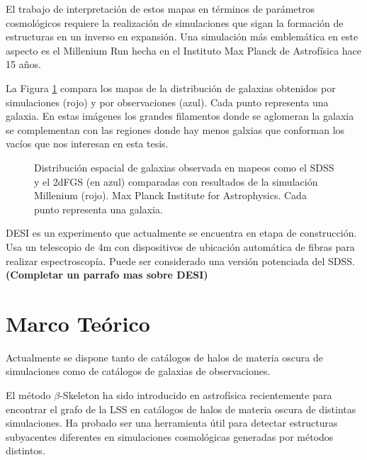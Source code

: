 \documentclass[preprint]{aastex62}
\begin{document}
El trabajo de interpretaci\'on de estos mapas en t\'erminos de
par\'ametros cosmol\'ogicos requiere la realizaci\'on de simulaciones
que sigan la formaci\'on de estructuras en un inverso en expansi\'on.
Una simulación m\'as emblem\'atica en este aspecto es el Millenium Run
hecha en el Instituto Max Planck de Astrof\'isica hace 15 a\~nos. 

La Figura \ref{fig:pie_millenium_walls} compara los mapas de la
distribuci\'on de galaxias obtenidos por simulaciones (rojo) y por
observaciones (azul).
Cada punto representa una galaxia.
En estas im\'agenes los grandes filamentos donde se aglomeran la
galaxia se complementan con las regiones donde hay menos galxias que
conforman los vac\'ios que nos interesan en esta tesis.

  \begin{figure}
    \caption{Distribuci\'on espacial de galaxias observada en mapeos
      como el SDSS y el 2dFGS (en azul) comparadas con resultados de
      la simulación Millenium (rojo). Max Planck Institute for
      Astrophysics.
      Cada punto representa una galaxia. 
      \label{fig:pie_millenium_walls}}
  \end{figure}
  
  DESI es un experimento que actualmente se encuentra en etapa de construcción. Usa un telescopio de 4m con
  dispositivos de ubicación automática de fibras para realizar espectroscopía. Puede ser considerado una versión
  potenciada del SDSS. 
{\bf (Completar un parrafo mas sobre DESI)}

  \section{Marco Teórico}

  Actualmente se dispone tanto de catálogos de halos de materia oscura de simulaciones como de catálogos de
  galaxias de observaciones.


  El método $\beta$-Skeleton ha sido introducido en astrofísica recientemente \citep{Fang2018} para
  encontrar el grafo de la LSS en catálogos de halos de materia oscura de distintas simulaciones.
  Ha probado ser una herramienta útil para detectar estructuras subyacentes diferentes en
  simulaciones cosmológicas generadas por métodos distintos.


\end{document}
